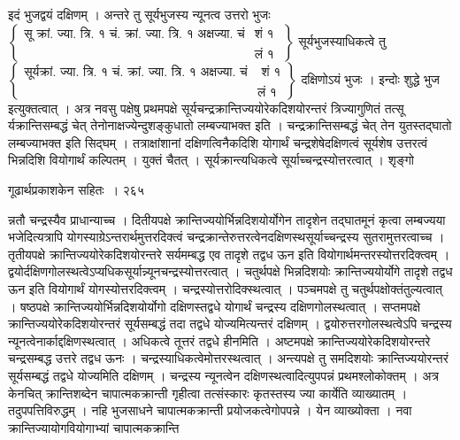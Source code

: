 \documentclass[11pt, openany]{book}
\begin{document}
इदं भुजद्वयं दक्षिणम् । अन्तरे तु सूर्यभुजस्य न्यूनत्व उत्तरो भुजः 
{\scriptsize{$\left\{
\begin{array}{lr}\mbox{
सू क्रां. ज्या. त्रि. १ चं. क्रां. ज्या. त्रि. १ अक्षज्या. चं} & \mbox{शं १}\\
 & \mbox{लं १ }
\end{array}
\right\}$ }}
सूर्यभुजस्याधिकत्वे तु
{\scriptsize{$\left\{
\begin{array}{lr}\mbox{
\ सूर्यक्रां. ज्या. त्रि. १ चं. क्रां. ज्या. त्रि. १ अक्षज्या. चं} & \mbox{ शं १}\\
& \mbox{लं १ }
\end{array}
\right\}$ }}
दक्षिणोऽयं भुजः । इन्दोः शुद्धे भुज इत्युक्तत्वात् । अत्र नवसु पक्षेषु प्रथमपक्षे सूर्यचन्द्रक्रान्तिज्ययोरेकदिशयोरन्तरं त्रिज्यागुणितं तत्सू र्यक्रान्तिसम्बद्धं चेत् तेनोनाक्षज्येन्दुशङ्कुधातो लम्बज्याभक्त इति । चन्द्रक्रान्तिसम्बद्धं चेत् तेन युतस्तद्घातो लम्बज्याभक्त इति सिद्घम् । तत्राक्षांशानां दक्षिणत्विनैकदिशि योगार्थं चन्द्रशेषेदक्षिणत्वं सूर्यशेष उत्तरत्वं भिन्नदिशि वियोगार्थं कल्पितम् । युक्तं चैतत् । सूर्यक्रान्त्यधिकत्वे सूर्याच्चन्द्रस्योत्तरत्वात् । शृङ्गो\textendash



\newpage


\hspace{3cm} गूढार्थप्रकाशकेन सहितः~। \hfill २६५
\vspace{1cm}


\noindent न्नतौ चन्द्रस्यैव प्राधान्याच्च । दितीयपक्षे क्रान्तिज्ययोर्भिन्नदिशयोर्योगेन तादृशेन तद्घातमूनं कृत्वा लम्बज्यया भजेदित्यत्रापि योगस्याग्रेऽन्तरार्थमुत्तरदिक्त्वं चन्द्रक्रान्तेरुत्तरत्वेनदक्षिणस्थसूर्याच्चन्द्रस्य सुतरामुत्तरत्वाच्च । तृतीयपक्षे क्रान्तिज्ययोरेकदिशयोरन्तरे सर्यमम्बद्ध एव तादृशे तद्वध ऊन इति वियोगार्थमन्तरस्योत्तरदिक्त्वम् । द्वयोर्दक्षिणगोलस्थत्वेऽप्यधिकसूर्यान्न्यूनचन्द्रस्योत्तरत्वात् । चतुर्थपक्षे भिन्नदिशयोः क्रान्तिज्ययोर्योगे तादृशे तद्वध ऊन इति वियोगार्थं योगस्योत्तरदिक्त्वम् । चन्द्रस्योत्तरोदिक्स्थत्वात् । पञ्चमपक्षे तु चतुर्थपक्षोक्तंतुल्यत्वात् । षष्ठपक्षे क्रान्तिज्ययोर्भिन्नदिशयोर्योगो दक्षिणस्तद्वधे योगार्थं चन्द्रस्य दक्षिणगोलस्थत्वात् । सप्तमपक्षे क्रान्तिज्ययोरेकदिशयोरन्तरं सूर्यसम्बद्धं तदा तद्वधे योज्यमित्यन्तरं दक्षिणम् । द्वयोरुत्तरगोलस्थत्वेऽपि चन्द्रस्य न्यूनत्वेनार्काद्दक्षिणस्थत्वात् । अधिकत्वे तूत्तरं तद्वधे हीनमिति । अष्टमपक्षे क्रान्तिज्ययोरेकदिशयोरन्तरे चन्द्रसम्बद्ध उत्तरे तद्वध ऊनः । चन्द्रस्याधिकत्वेमोत्तरस्थत्वात् । अन्त्यपक्षे तु समदिशयोः क्रान्तिज्ययोरन्तरं सूर्यसम्बद्धं तद्वधे योज्यमिति दक्षिणम् । चन्द्रस्य न्यूनत्वेन दक्षिणस्थत्वादित्युपपन्नं प्रथमश्लोकोक्तम् । अत्र केनचित् क्रान्तिशब्देन चापात्मकक्रान्ती गृहीत्वा तत्संस्कारः कृतस्तस्य ज्या कार्येति व्याख्यातम् । तदुपपत्तिविरुद्धम् । नहि भुजसाधने चापात्मकक्रान्ती प्रयोजकत्वेगोपपन्ने । येन व्याख्योक्ता । नवा क्रान्तिज्यायोगवियोगाभ्यां चापात्मकक्रान्ति
\end{document}
